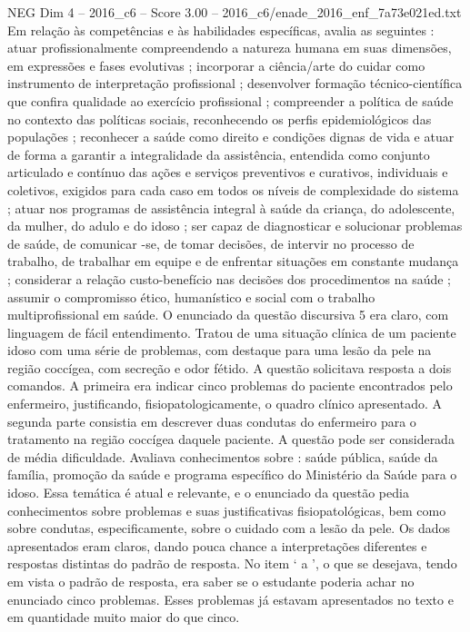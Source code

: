 \begin{textsample}{NEG Dim 4 – 2016\_c6 – Score 3.00 – 2016\_c6/enade\_2016\_enf\_7a73e021ed.txt}
Em relação às competências e às habilidades específicas, avalia as seguintes : atuar profissionalmente compreendendo a natureza humana em suas dimensões, em expressões e fases evolutivas ; incorporar a ciência/arte do cuidar como instrumento de interpretação profissional ; desenvolver formação técnico-científica que confira qualidade ao exercício profissional ; compreender a política de saúde no contexto das políticas sociais, reconhecendo os perfis epidemiológicos das populações ; reconhecer a saúde como direito e condições dignas de vida e atuar de forma a garantir a integralidade da assistência, entendida como conjunto articulado e contínuo das ações e serviços preventivos e curativos, individuais e coletivos, exigidos para cada caso em todos os níveis de complexidade do sistema ; atuar nos programas de assistência integral à saúde da criança, do adolescente, da mulher, do adulo e do idoso ; ser capaz de diagnosticar e solucionar problemas de saúde, de comunicar -se, de tomar decisões, de intervir no processo de trabalho, de trabalhar em equipe e de enfrentar situações em constante mudança ; considerar a relação custo-benefício nas decisões dos procedimentos na saúde ; assumir o compromisso ético, humanístico e social com o trabalho multiprofissional em saúde.
O enunciado da questão discursiva 5 era claro, com linguagem de fácil entendimento.
Tratou de uma situação clínica de um paciente idoso com uma série de problemas, com destaque para uma lesão da pele na região coccígea, com secreção e odor fétido.
A questão solicitava resposta a dois comandos.
A primeira era indicar cinco problemas do paciente encontrados pelo enfermeiro, justificando, fisiopatologicamente, o quadro clínico apresentado.
A segunda parte consistia em descrever duas condutas do enfermeiro para o tratamento na região coccígea daquele paciente.
A questão pode ser considerada de média dificuldade.
Avaliava conhecimentos sobre : saúde pública, saúde da família, promoção da saúde e programa específico do Ministério da Saúde para o idoso.
Essa temática é atual e relevante, e o enunciado da questão pedia conhecimentos sobre problemas e suas justificativas fisiopatológicas, bem como sobre condutas, especificamente, sobre o cuidado com a lesão da pele.
Os dados apresentados eram claros, dando pouca chance a interpretações diferentes e respostas distintas do padrão de resposta.
No item ‘ a ’, o que se desejava, tendo em vista o padrão de resposta, era saber se o estudante poderia achar no enunciado cinco problemas.
Esses problemas já estavam apresentados no texto e em quantidade muito maior do que cinco.

\end{textsample}
